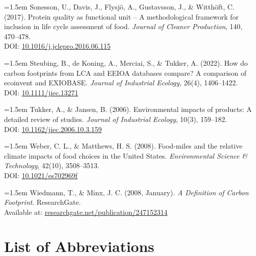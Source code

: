 \documentclass[12pt,a4paper]{article}%
\begin{document}
\vspace{0.5em}
{\small
\noindent
\parbox{\linewidth}{
\hangindent=1.5em
Sonesson, U., Davis, J., Flysjö, A., Gustavsson, J., \& Witthöft, C. (2017). Protein quality as functional unit – A methodological framework for inclusion in life cycle assessment of food. \textit{Journal of Cleaner Production}, 140, 470–478. \\
DOI: \href{https://doi.org/10.1016/j.jclepro.2016.06.115}{10.1016/j.jclepro.2016.06.115}
}
}

\vspace{0.5em}
{\small
\noindent
\parbox{\linewidth}{
\hangindent=1.5em
Steubing, B., de Koning, A., Merciai, S., \& Tukker, A. (2022). How do carbon footprints from LCA and EEIOA databases compare? A comparison of ecoinvent and EXIOBASE. \textit{Journal of Industrial Ecology}, 26(4), 1406–1422. \\
DOI: \href{https://doi.org/10.1111/jiec.13271}{10.1111/jiec.13271}
}
}

\vspace{0.5em}
{\small
\noindent
\parbox{\linewidth}{
\hangindent=1.5em
Tukker, A., \& Jansen, B. (2006). Environmental impacts of products: A detailed review of studies. \textit{Journal of Industrial Ecology}, 10(3), 159–182. \\
DOI: \href{https://doi.org/10.1162/jiec.2006.10.3.159}{10.1162/jiec.2006.10.3.159}
}
}

\vspace{0.5em}
{\small
\noindent
\parbox{\linewidth}{
\hangindent=1.5em
Weber, C. L., \& Matthews, H. S. (2008). Food-miles and the relative climate impacts of food choices in the United States. \textit{Environmental Science \& Technology}, 42(10), 3508–3513. \\
DOI: \href{https://doi.org/10.1021/es702969f}{10.1021/es702969f}
}
}

\vspace{0.5em}
{\small
\noindent
\parbox{\linewidth}{
\hangindent=1.5em
Wiedmann, T., \& Minx, J. C. (2008, January). \textit{A Definition of Carbon Footprint}. ResearchGate. \\
Available at: \href{https://www.researchgate.net/publication/247152314_A_Definition_of_Carbon_Footprint}{researchgate.net/publication/247152314}
}
}

\newpage
\clearpage
{}

\section*{List of Abbreviations}
\end{document}
